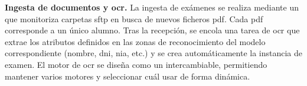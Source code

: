 
\item \textbf{Ingesta de documentos y \acs{ocr}.} \label{rf:ingestion}
La ingesta de exámenes se realiza mediante un  que monitoriza carpetas
\acs{sftp} en busca de nuevos ficheros \acs{pdf}. Cada \acs{pdf} corresponde a un único
alumno. Tras la recepción, se encola una tarea de \acs{ocr} que
extrae los atributos definidos en las zonas de reconocimiento del modelo correspondiente
(nombre, \acs{dni}, \acs{nia}, etc.) y se crea automáticamente la instancia de examen. El
motor de \acs{ocr} se diseña como un  intercambiable, permitiendo mantener
varios motores y seleccionar cuál usar de forma dinámica.

